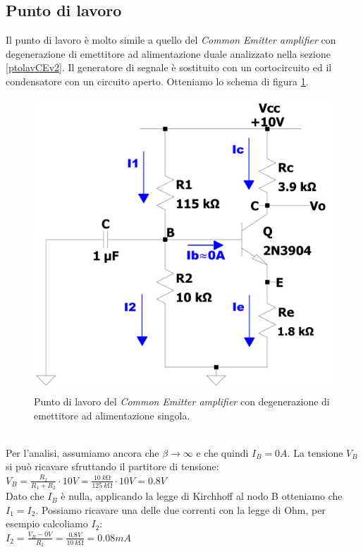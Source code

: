 \documentclass{report}
\begin{document}
\subsection{Punto di lavoro} \label{CEv3_plcap}
Il punto di lavoro è molto simile a quello del \textit{Common Emitter amplifier} con degenerazione di emettitore ad alimentazione duale analizzato nella sezione \ref{ptolavCEv2}. Il generatore di segnale è sostituito con un cortocircuito ed il condensatore con un circuito aperto. Otteniamo lo schema di figura \ref{figura:CEv3_pl}.
\begin{figure}[h]
\centering
\includegraphics[height=11cm]{immagini/CEv3_pl}
\caption{Punto di lavoro del \textit{Common Emitter amplifier} con degenerazione di emettitore ad alimentazione singola.}
\label{figura:CEv3_pl}
\end{figure}
\\Per l'analisi, assumiamo ancora che $\displaystyle{\beta\rightarrow\infty}$ e che quindi $I_{B}=0A$. La tensione $V_B$ si può ricavare sfruttando il partitore di tensione: %
\\[2pt]\indent$\displaystyle{V_B=\frac{R_2}{R_1+R_2}\cdot 10V=\frac{\SI{10}{k\ohm}}{\SI{125}{k\ohm}}\cdot 10V=0.8V}$
\\[2pt]Dato che $I_B$ è nulla, applicando la legge di Kirchhoff al nodo B otteniamo che $I_1=I_2$. Possiamo ricavare una delle due correnti con la legge di Ohm, per esempio calcoliamo $I_2$:
\\[2pt]\indent$\displaystyle{I_2=\frac{V_B-0V}{R_2}=\frac{0.8V}{\SI{10}{k\ohm}}=0.08mA}$
\end{document}
